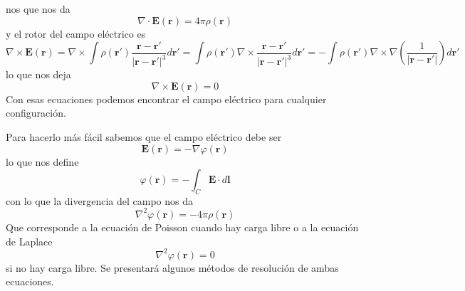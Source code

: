 ﻿\documentclass{article}
\numberwithin{equation}{section} %
\renewcommand{\vec}[1]{\boldsymbol{#1}}
\begin{document}
nos que nos da
\begin{equation}
\nabla \cdot \vec{E}(\vec{r}) = 4\pi \rho(\vec{r})
\label{eq:gauss_diff}
\end{equation}
y el rotor del campo eléctrico es
\[\nabla \times \vec{E}(\vec{r}) = \nabla \times \int \rho(\vec{r}') \frac{\vec{r} - \vec{r}'}{|\vec{r} - \vec{r}'|^3} d\vec{r}' = \int \rho(\vec{r}') \nabla \times \frac{\vec{r} - \vec{r}'}{|\vec{r} - \vec{r}'|^3} d\vec{r}' = - \int \rho(\vec{r}') \nabla \times \nabla \left(\frac{1}{|\vec{r} - \vec{r}'|}\right) d\vec{r}'\]
lo que nos deja 
\begin{equation}
\nabla \times \vec{E}(\vec{r}) = 0
\label{eq:electroestatica_rotor}
\end{equation}
Con esas ecuaciones podemos encontrar el campo eléctrico para cualquier configuración.

Para hacerlo más fácil sabemos que el campo eléctrico debe ser
\begin{equation}
 \vec{E}(\vec{r}) = - \nabla \varphi(\vec{r})
 \label{eq:electroestatico_potencial}
\end{equation}
lo que nos define
\begin{equation}
 \varphi(\vec{r}) = - \int_C \vec{E} \cdot d\vec{l}
 \label{eq:electroestatico_potencial_integral}
\end{equation}
con lo que la divergencia del campo nos da
\begin{equation}
 \nabla^2 \varphi(\vec{r}) = - 4  \pi \rho(\vec{r})
\end{equation}
Que corresponde a la ecuación de Poisson cuando hay carga libre o a la ecuación de Laplace
\begin{equation}
 \nabla^2 \varphi(\vec{r}) = 0
 \end{equation}
 si no hay carga libre. Se presentará algunos métodos de resolución de ambas ecuaciones.
 
\end{document}
